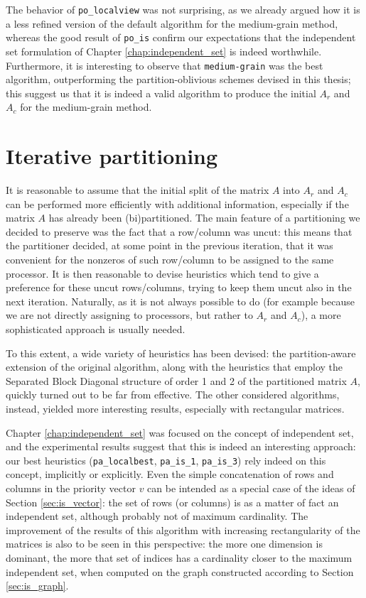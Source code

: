 The behavior of \verb|po_localview| was not surprising, as we already argued how it is a less refined version of the default algorithm for the medium-grain method, whereas the good result of \verb|po_is| confirm our expectations that the independent set formulation of Chapter \ref{chap:independent_set} is indeed worthwhile. Furthermore, it is interesting to observe that \verb|medium-grain| was the best algorithm, outperforming the partition-oblivious schemes devised in this thesis; this suggest us that it is indeed a valid algorithm to produce the initial $A_r$ and $A_c$ for the medium-grain method.

\section{Iterative partitioning} \label{sec:conclusions_pa}

It is reasonable to assume that the initial split of the matrix $A$ into $A_r$ and $A_c$ can be performed more efficiently with additional information, especially if the matrix $A$ has already been (bi)partitioned. The main feature of a partitioning we decided to preserve was the fact that a row/column was uncut: this means that the partitioner decided, at some point in the previous iteration, that it was convenient for the nonzeros of such row/column to be assigned to the same processor. It is then reasonable to devise heuristics which tend to give a preference for these uncut rows/columns, trying to keep them uncut also in the next iteration. Naturally, as it is not always possible to do (for example because we are not directly assigning to processors, but rather to $A_r$ and $A_c$), a more sophisticated approach is usually needed.

To this extent, a wide variety of heuristics has been devised: the partition-aware extension of the original algorithm, along with the heuristics that employ the Separated Block Diagonal structure of order 1 and 2 of the partitioned matrix $A$, quickly turned out to be far from effective. The other considered algorithms, instead, yielded more interesting results, especially with rectangular matrices.

Chapter \ref{chap:independent_set} was focused on the concept of independent set, and the experimental results suggest that this is indeed an interesting approach: our best heuristics (\verb|pa_localbest|, \verb|pa_is_1|, \verb|pa_is_3|) rely indeed on this concept, implicitly or explicitly. Even the simple concatenation of rows and columns in the priority vector $v$ can be intended as a special case of the ideas of Section \ref{sec:is_vector}: the set of rows (or columns) is as a matter of fact an independent set, although probably not of maximum cardinality. The improvement of the results of this algorithm with increasing rectangularity of the matrices is also to be seen in this perspective: the more one dimension is dominant, the more that set of indices has a cardinality closer to the maximum independent set, when computed on the graph constructed according to Section \ref{sec:is_graph}.

